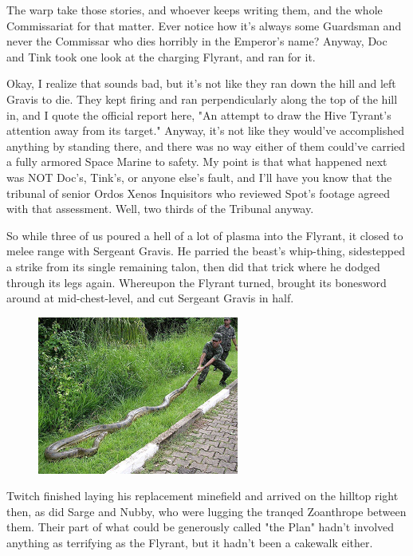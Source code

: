 The warp take those stories, and whoever keeps writing them, and the whole Commissariat for that matter. 
Ever notice how it's always some Guardsman and never the Commissar who dies horribly in the Emperor's name? 
Anyway, Doc and Tink took one look at the charging Flyrant, and ran for it.

Okay, I realize that sounds bad, but it's not like they ran down the hill and left Gravis to die. 
They kept firing and ran perpendicularly along the top of the hill in, and I quote the official report here, "An attempt to draw the Hive Tyrant's attention away from its target." Anyway, it's not like they would've accomplished anything by standing there, and there was no way either of them could've carried a fully armored Space Marine to safety. 
My point is that what happened next was NOT Doc's, Tink's, or anyone else's fault, and I'll have you know that the tribunal of senior Ordos Xenos Inquisitors who reviewed Spot's footage agreed with that assessment. 
Well, two thirds of the Tribunal anyway.

So while three of us poured a hell of a lot of plasma into the Flyrant, it closed to melee range with Sergeant Gravis. 
He parried the beast's whip-thing, sidestepped a strike from its single remaining talon, then did that trick where he dodged through its legs again. 
Whereupon the Flyrant turned, brought its bonesword around at mid-chest-level, and cut Sergeant Gravis in half.
\begin{figure}
	\begin{center}
		\includegraphics[width=\figwidth]{pics/12/51.png}
	\end{center}
\end{figure}
Twitch finished laying his replacement minefield and arrived on the hilltop right then, as did Sarge and Nubby, who were lugging the tranqed Zoanthrope between them. 
Their part of what could be generously called "the Plan" hadn't involved anything as terrifying as the Flyrant, but it hadn't been a cakewalk either. 


